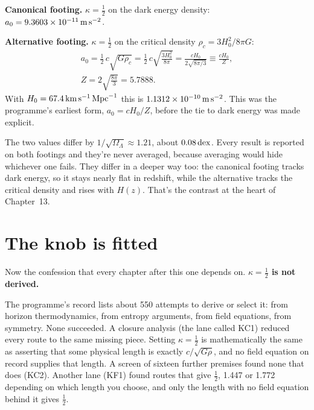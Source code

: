 


\textbf{Canonical footing.} $\kappa=\tfrac12$ on the dark energy density: $a_0=9.3603\times10^{-11}\,\mathrm{m\,s^{-2}}$.

\textbf{Alternative footing.} $\kappa=\tfrac12$ on the critical density $\rho_c=3H_0^2/8\pi G$:
\begin{gather}
a_0=\frac12\,c\sqrt{G\rho_c}=\frac12\,c\sqrt{\frac{3H_0^2}{8\pi}}=\frac{cH_0}{2\sqrt{8\pi/3}}\equiv\frac{cH_0}{Z},\\
Z=2\sqrt{\frac{8\pi}{3}}=5.7888.
\end{gather}
With $H_0=67.4\,\mathrm{km\,s^{-1}}\,\mathrm{Mpc}^{-1}$ this is $1.1312\times10^{-10}\,\mathrm{m\,s^{-2}}$. This was the programme's earliest form, $a_0=cH_0/Z$, before the tie to dark energy was made explicit.

The two values differ by $1/\sqrt{\Omega_\Lambda}\approx1.21$, about $0.08\,\mathrm{dex}$. Every result is reported on both footings and they're never averaged, because averaging would hide whichever one fails. They differ in a deeper way too: the canonical footing tracks dark energy, so it stays nearly flat in redshift, while the alternative tracks the critical density and rises with $H(z)$. That's the contrast at the heart of Chapter~13.

\section{The knob is fitted}

Now the confession that every chapter after this one depends on. \textbf{$\kappa=\tfrac12$ is not derived.}

The programme's record lists about 550 attempts to derive or select it: from horizon thermodynamics, from entropy arguments, from field equations, from symmetry. None succeeded. A closure analysis (the lane called KC1) reduced every route to the same missing piece. Setting $\kappa=\tfrac12$ is mathematically the same as asserting that some physical length is exactly $c/\sqrt{G\rho}$, and no field equation on record supplies that length. A screen of sixteen further premises found none that does (KC2). Another lane (KF1) found routes that give $\tfrac12$, 1.447 or 1.772 depending on which length you choose, and only the length with no field equation behind it gives $\tfrac12$.

